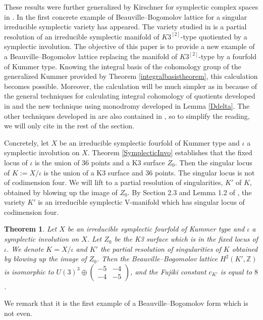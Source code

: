 \documentclass{alggeom}
\newcommand{\Z}{\mathbb{Z}}
\theoremstyle{plain}
\newtheorem{thm}[theorem]{Theorem}
\theoremstyle{definition}
\theoremstyle{remark}
\begin{document}
These results were further generalized by Kirschner for symplectic complex spaces in \cite{Tim}. 
In \cite[Theorem 2.5]{Lol2} the first concrete example of Beauville--Bogomolov lattice for a singular irreducible symplectic variety has appeared. 
The variety studied in \cite{Lol2} is a partial resolution of an irreducible symplectic manifold of $K3^{[2]}$-type quotiented by a symplectic involution. The objective of this paper is to provide a new example of a Beauville--Bogomolov lattice replacing the manifold of $K3^{[2]}$-type by a fourfold of Kummer type. 
Knowing the integral basis of the cohomology group of the generalized Kummer provided by Theorem \ref{integralbasistheorem}, this calculation becomes possible. 
Moreover, the calculation will be much simpler as in \cite{Lol2} because of the general techniques for calculating integral cohomology of quotients developed in \cite{Lol} and the new technique using monodromy developed in Lemma \ref{Ddelta}. 
The other techniques developed in \cite{Lol2} are also contained in \cite{Lol}, so to simplify the reading, we will only cite \cite{Lol2} in the rest of the section.

Concretely, let $X$ be an irreducible symplectic fourfold of Kummer type and $\iota$ a symplectic involution on $X$. Theorem \ref{SymplecticInvo} establishes that the fixed locus of $\iota$ is the union of 36 points and a K3 surface $Z_0$. Then the singular locus of $K:=X/\iota$ is the union of a K3 surface and 36 points. The singular locus is not of codimension four. We will lift to a partial resolution of singularities,
$K'$ of $K$, obtained by blowing up the image of $Z_0$. By Section 2.3 and Lemma 1.2 of \cite{Fujiki2}, the variety $K'$ is an irreducible symplectic V-manifold which has singular locus of codimension four.


\begin{thm}\label{theorem}
Let $X$ be an irreducible symplectic fourfold of Kummer type and $\iota$ a symplectic involution on $X$.
Let $Z_0$ be the K3 surface which is in the fixed locus of $\iota$.
We denote $K=X/\iota$ and $K'$ the partial resolution of singularities of $K$ obtained by blowing up the image of $Z_0$.
Then the Beauville--Bogomolov lattice $H^2(K',\Z)$ is isomorphic to $U(3)^{3}\oplus\left(
\begin{array}{cc}
-5 & -4\\
-4 & -5 
\end{array} \right)$, and the Fujiki constant $c_{K'}$ is equal to $8$.
\end{thm}
We remark that it is the first example of a Beauville--Bogomolov form which is not even.
\end{document}
